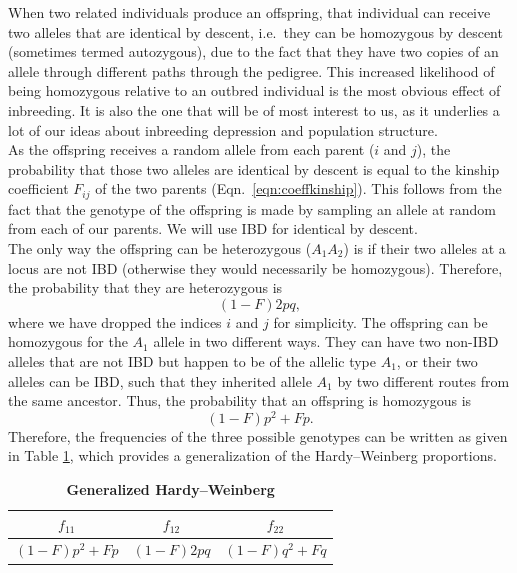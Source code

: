 When two related individuals produce an offspring, that individual can
receive two alleles that are identical by descent, i.e.\ they
can be homozygous by descent (sometimes termed autozygous), due to the
fact that they have two copies of an allele through different paths
through the pedigree.  This increased likelihood of being homozygous
relative to an outbred individual is the most obvious effect of
inbreeding. It is also the one that will be of most interest to us, as it
underlies a lot of our ideas about inbreeding depression and
population structure.\\


As the offspring receives a random allele from each parent ($i$ and $j$), the
probability that those two alleles are identical by descent is equal to the
kinship coefficient $F_{ij}$ of the two parents (Eqn.\ \ref{eqn:coeffkinship}). This follows from the fact that
the genotype of the offspring is made by sampling an allele at random from each
of our parents. We will use IBD for identical by descent. \\

The only way the offspring can be heterozygous ($A_1 A_2$) is if their two alleles at a
locus are not IBD (otherwise they would necessarily be homozygous). Therefore, the probability that they are
heterozygous is
\begin{equation}
(1-F) 2p q,
\label{eq:hetGenHW}
\end{equation}
where we have dropped the indices $i$ and $j$ for simplicity.
The offspring can be homozygous for the $A_1$ allele in two different ways. 
They can have two non-IBD alleles that are not IBD but happen to be of the allelic type $A_1$,
or their two alleles can be IBD, such that they inherited allele $A_1$ by
two different routes from the same ancestor. Thus, the probability that an offspring is homozygous is
\begin{equation}
(1-F) p^2 + F p.
\end{equation}
Therefore, the frequencies of the three possible genotypes can be written as given in
Table \ref{table:GeneralizedHWE}, which provides a generalization of the Hardy--Weinberg
proportions.\\

\begin{table}
\begin{center}
\begin{tabular}{|ccc|}
\hline
$f_{11}$ & $f_{12}$ & $f_{22}$ \\
\hline
$(1-F) p^2 + F p$ & $(1-F) 2pq$ & $(1-F) q^2 + F q$ \\
\hline
\end{tabular}
\end{center}
\caption{\textbf{Generalized Hardy--Weinberg}} \label{table:GeneralizedHWE}
\end{table}

